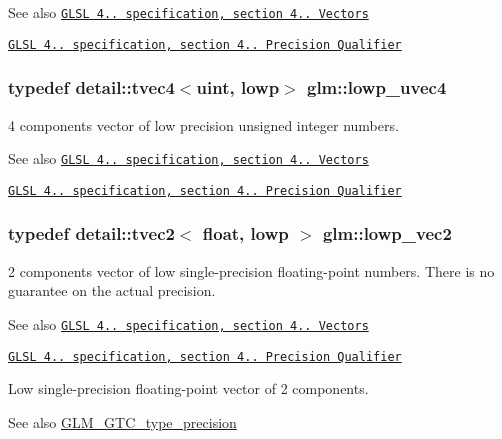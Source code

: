 \begin{DoxySeeAlso}{See also}
\href{http://www.opengl.org/registry/doc/GLSLangSpec.4.20.8.pdf}{\tt G\+L\+SL 4.. specification, section 4.. Vectors} 

\href{http://www.opengl.org/registry/doc/GLSLangSpec.4.20.8.pdf}{\tt G\+L\+SL 4.. specification, section 4.. Precision Qualifier} 
\end{DoxySeeAlso}
\subsubsection[{\texorpdfstring{lowp\+\_\+uvec4}{lowp_uvec4}}]{\setlength{\rightskip}{0pt plus 5cm}typedef detail\+::tvec4$<$uint, lowp$>$ {\bf glm\+::lowp\+\_\+uvec4}}\hypertarget{group__core__precision_ga17b5f652e5c64b0034065420d844fca7}{}\label{group__core__precision_ga17b5f652e5c64b0034065420d844fca7}
4 components vector of low precision unsigned integer numbers.

\begin{DoxySeeAlso}{See also}
\href{http://www.opengl.org/registry/doc/GLSLangSpec.4.20.8.pdf}{\tt G\+L\+SL 4.. specification, section 4.. Vectors} 

\href{http://www.opengl.org/registry/doc/GLSLangSpec.4.20.8.pdf}{\tt G\+L\+SL 4.. specification, section 4.. Precision Qualifier} 
\end{DoxySeeAlso}
\subsubsection[{\texorpdfstring{lowp\+\_\+vec2}{lowp_vec2}}]{\setlength{\rightskip}{0pt plus 5cm}typedef detail\+::tvec2$<$ float, lowp $>$ {\bf glm\+::lowp\+\_\+vec2}}\hypertarget{group__core__precision_gac63d79532b7e8d18f579ebe63e4fde49}{}\label{group__core__precision_gac63d79532b7e8d18f579ebe63e4fde49}
2 components vector of low single-\/precision floating-\/point numbers. There is no guarantee on the actual precision.

\begin{DoxySeeAlso}{See also}
\href{http://www.opengl.org/registry/doc/GLSLangSpec.4.20.8.pdf}{\tt G\+L\+SL 4.. specification, section 4.. Vectors} 

\href{http://www.opengl.org/registry/doc/GLSLangSpec.4.20.8.pdf}{\tt G\+L\+SL 4.. specification, section 4.. Precision Qualifier}
\end{DoxySeeAlso}
Low single-\/precision floating-\/point vector of 2 components. \begin{DoxySeeAlso}{See also}
\hyperlink{group__gtc__type__precision}{G\+L\+M\+\_\+\+G\+T\+C\+\_\+type\+\_\+precision} 
\end{DoxySeeAlso}
